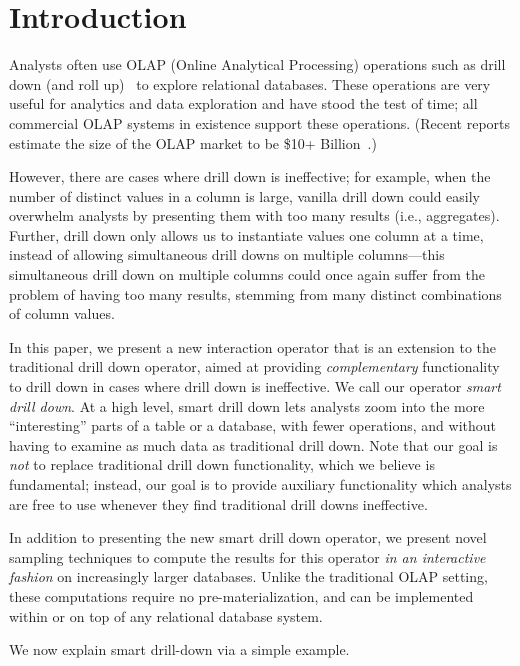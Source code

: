 

\section{Introduction}
Analysts often use OLAP (Online Analytical Processing) operations
such as drill down (and roll up)~\cite{export:69578} to explore
relational databases. 
These operations are very useful for analytics and data exploration and have stood the test of time;
all commercial OLAP systems 
in existence support these operations. (Recent reports estimate the size of the OLAP market to be \$10+ Billion~\cite{gartner}.)


However, there are cases where drill down is ineffective; 
for example, when the number of distinct values
in a column is large, vanilla drill down 
could easily overwhelm analysts by presenting them with too many 
results (i.e., aggregates). 
Further, drill down only allows us to instantiate values
 one column at a time, instead of allowing simultaneous drill downs
on multiple columns---this simultaneous drill down on multiple columns 
could once again suffer from the problem
of having too many results, stemming from many distinct combinations of column values.

In this paper, we present a new interaction operator 
that is an extension to the traditional 
drill down operator, aimed at providing {\em complementary}
functionality to drill down in cases where drill down is
ineffective. We call our operator {\em smart drill down}.
At a high level, smart drill down lets analysts zoom into
the more ``interesting'' parts of a table or a database,
with fewer operations, and without having to examine as much
data as traditional drill down.
Note that our goal is {\em not} to replace traditional 
drill down functionality, which we believe is fundamental;
instead, our goal is to provide auxiliary functionality 
which analysts are free to use whenever they find 
traditional drill downs ineffective.

In addition to presenting the new smart drill down operator, we present novel sampling techniques to compute the results for this
operator {\em in an interactive fashion} on increasingly larger databases. 
Unlike the traditional OLAP setting, these computations 
require no pre-materialization, and can be implemented 
within or on top of any relational database system.



We now explain smart drill-down via a simple example.

